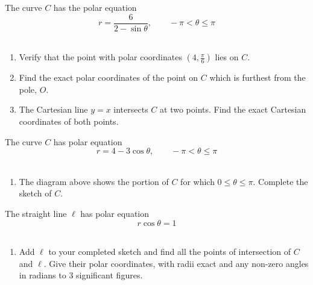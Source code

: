 \documentclass[leqno]{article}
\begin{document}
\begin{enumerate}[
  label=\textbf{\arabic*.},
  leftmargin=*,
  topsep=0pt,
  partopsep=0pt,
  parsep=0pt
]
\newpage

\questionitem

The curve $C$ has the polar equation
\[
r=\frac{6}{2-\sin\theta},\qquad -\pi<\theta\leq\pi
\] \\
\begin{enumerate}[label=\textbf{(\alph*)}]
\item Verify that the point with polar coordinates $\left(4,\frac{\pi}{6}\right)$ lies on $C$.  \\
\item Find the exact polar coordinates of the point on $C$ which is furthest from the pole, $O$.  \\
\item The Cartesian line $y=x$ intersects $C$ at two points. Find the exact Cartesian coordinates of both points.  \\
\end{enumerate}

\newpage

\questionitem

\begin{figure}[H]
    \centering
{}
\end{figure}


The curve $C$ has polar equation
\[
r=4-3\cos\theta,\qquad -\pi<\theta\leq\pi
\] \\
\begin{enumerate}[label=\textbf{(\alph*)}]
\item The diagram above shows the portion of $C$ for which $0\leq\theta\leq\pi$. Complete the sketch of $C$.  \\
\end{enumerate}
The straight line $\ell$ has polar equation
\[
r\cos\theta=1
\] \\
\begin{enumerate}[label=\textbf{(\alph*)}, resume]
\item Add $\ell$ to your completed sketch and find all the points of intersection of $C$ and $\ell$. Give their polar coordinates, with radii exact and any non-zero angles in radians to $3$ significant figures.  \\
\end{enumerate}


\end{enumerate}
\end{document}
